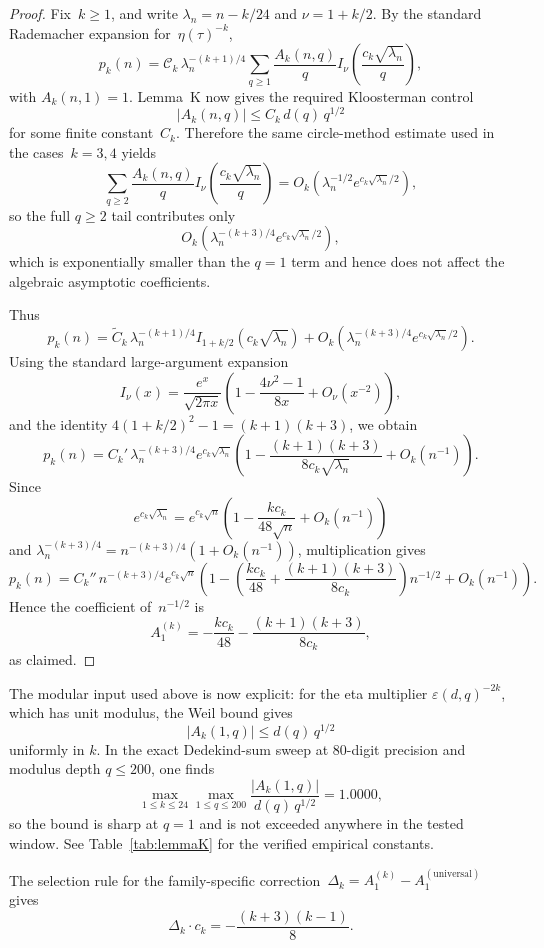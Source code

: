 \documentclass[11pt,a4paper]{article}
\begin{document}
\begin{proof}
Fix~$k\ge1$, and write $\lambda_n = n-k/24$ and $\nu = 1 + k/2$. By the standard Rademacher expansion for~$\eta(\tau)^{-k}$,
\[
  p_k(n)
  = \mathcal{C}_k\,\lambda_n^{-(k+1)/4}
    \sum_{q\ge1} \frac{A_k(n,q)}{q}
    I_\nu\!\left(\frac{c_k\sqrt{\lambda_n}}{q}\right),
\]
with $A_k(n,1)=1$. Lemma~K now gives the required Kloosterman control
\[
  |A_k(n,q)| \le C_k\,d(q)\,q^{1/2}
\]
for some finite constant~$C_k$. Therefore the same circle-method estimate used in the cases~$k=3,4$ yields
\[
  \sum_{q\ge2} \frac{A_k(n,q)}{q}
    I_\nu\!\left(\frac{c_k\sqrt{\lambda_n}}{q}\right)
  = O_k\!\left(\lambda_n^{-1/2} e^{c_k\sqrt{\lambda_n}/2}\right),
\]
so the full $q\ge2$ tail contributes only
\[
  O_k\!\left(\lambda_n^{-(k+3)/4} e^{c_k\sqrt{\lambda_n}/2}\right),
\]
which is exponentially smaller than the $q=1$ term and hence does not affect the algebraic asymptotic coefficients.

Thus
\[
  p_k(n)
  = \widetilde C_k\,\lambda_n^{-(k+1)/4} I_{1+k/2}(c_k\sqrt{\lambda_n})
    + O_k\!\left(\lambda_n^{-(k+3)/4}e^{c_k\sqrt{\lambda_n}/2}\right).
\]
Using the standard large-argument expansion
\[
  I_\nu(x)=\frac{e^x}{\sqrt{2\pi x}}
  \left(1-\frac{4\nu^2-1}{8x}+O_\nu(x^{-2})\right),
\]
and the identity $4(1+k/2)^2-1=(k+1)(k+3)$, we obtain
\[
  p_k(n)
  = C_k'\,\lambda_n^{-(k+3)/4}e^{c_k\sqrt{\lambda_n}}
    \left(1-\frac{(k+1)(k+3)}{8c_k\sqrt{\lambda_n}}+O_k(n^{-1})\right).
\]
Since
\[
  e^{c_k\sqrt{\lambda_n}}
  = e^{c_k\sqrt n}\left(1-\frac{k c_k}{48\sqrt n}+O_k(n^{-1})\right)
\]
and $\lambda_n^{-(k+3)/4}=n^{-(k+3)/4}(1+O_k(n^{-1}))$, multiplication gives
\[
  p_k(n)=C_k''\,n^{-(k+3)/4}e^{c_k\sqrt n}
  \left(1-
    \left(\frac{k c_k}{48}+\frac{(k+1)(k+3)}{8c_k}\right)n^{-1/2}
    + O_k(n^{-1})
  \right).
\]
Hence the coefficient of~$n^{-1/2}$ is
\[
  A_1^{(k)} = -\frac{k c_k}{48} - \frac{(k+1)(k+3)}{8c_k},
\]
as claimed.
\end{proof}

The modular input used above is now explicit: for the eta multiplier $\varepsilon(d,q)^{-2k}$, which has unit modulus, the Weil bound gives
\[
  |A_k(1,q)| \le d(q)\,q^{1/2}
\]
uniformly in $k$. In the exact Dedekind-sum sweep at 80-digit precision and modulus depth $q\le 200$, one finds
\[
  \max_{1\le k\le 24}\max_{1\le q\le 200} \frac{|A_k(1,q)|}{d(q)\,q^{1/2}} = 1.0000,
\]
so the bound is sharp at $q=1$ and is not exceeded anywhere in the tested window. See Table~\ref{tab:lemmaK} for the verified empirical constants.

The selection rule for the family-specific correction~$\Delta_k = A_1^{(k)} - A_1^{(\mathrm{universal})}$ gives
\begin{equation}\label{eq:delta_k}
  \Delta_k \cdot c_k = -\frac{(k+3)(k-1)}{8}.
\end{equation}
\end{document}

